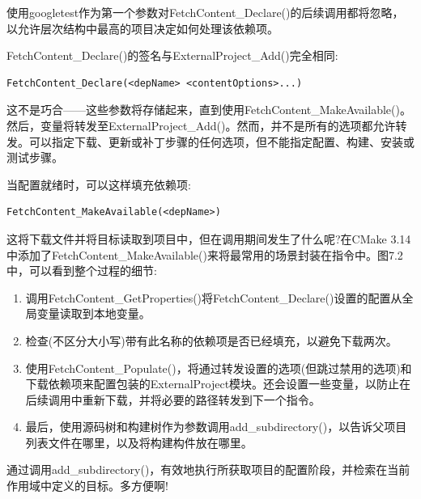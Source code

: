 使用googletest作为第一个参数对FetchContent\_Declare()的后续调用都将忽略，以允许层次结构中最高的项目决定如何处理该依赖项。

FetchContent\_Declare()的签名与ExternalProject\_Add()完全相同:

\begin{lstlisting}[style=styleCMake]
FetchContent_Declare(<depName> <contentOptions>...)
\end{lstlisting} 

这不是巧合——这些参数将存储起来，直到使用FetchContent\_MakeAvailable()。然后，变量将转发至ExternalProject\_Add()。然而，并不是所有的选项都允许转发。可以指定下载、更新或补丁步骤的任何选项，但不能指定配置、构建、安装或测试步骤。

当配置就绪时，可以这样填充依赖项:

\begin{lstlisting}[style=styleCMake]
FetchContent_MakeAvailable(<depName>)
\end{lstlisting} 

这将下载文件并将目标读取到项目中，但在调用期间发生了什么呢?在CMake 3.14中添加了FetchContent\_MakeAvailable()来将最常用的场景封装在指令中。图7.2中，可以看到整个过程的细节:

\begin{enumerate}
\item 
调用FetchContent\_GetProperties()将FetchContent\_Declare()设置的配置从全局变量读取到本地变量。

\item 
检查(不区分大小写)带有此名称的依赖项是否已经填充，以避免下载两次。

\item 
使用FetchContent\_Populate()，将通过转发设置的选项(但跳过禁用的选项)和下载依赖项来配置包装的ExternalProject模块。还会设置一些变量，以防止在后续调用中重新下载，并将必要的路径转发到下一个指令。

\item 
最后，使用源码树和构建树作为参数调用add\_subdirectory()，以告诉父项目列表文件在哪里，以及将构建构件放在哪里。
\end{enumerate}

通过调用add\_subdirectory()，有效地执行所获取项目的配置阶段，并检索在当前作用域中定义的目标。多方便啊!

